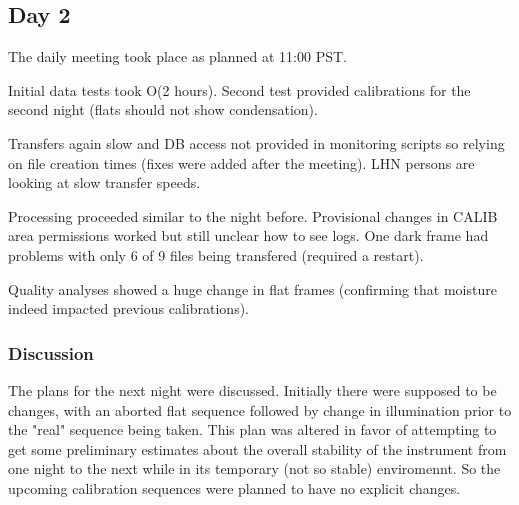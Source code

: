 \subsection{Day 2} \label{sec:day2}

The daily meeting took place as planned at 11:00 PST.

Initial data tests took O(2 hours).  Second test provided calibrations for the
second night (flats should not show condensation).  

Transfers again slow and DB access not provided in monitoring scripts so 
relying on file creation times (fixes were added after the meeting).  LHN
persons are looking at slow transfer speeds. 

Processing proceeded similar to the night before.  Provisional changes in 
CALIB area permissions worked but still unclear how to see logs.  One dark frame 
had problems with only 6 of 9 files being transfered (required a restart).

Quality analyses showed a huge change in flat frames (confirming that 
moisture indeed impacted previous calibrations).  

\subsubsection{Discussion}

The plans for the next night were discussed.  Initially there were supposed to be
changes, with an aborted flat sequence followed by change in illumination prior to
the "real" sequence being taken.  This plan was altered in favor of attempting to
get some preliminary estimates about the overall stability of the instrument from
one night to the next while in its temporary (not so stable) enviromennt.  So the
upcoming calibration sequences were planned to have no explicit changes.


